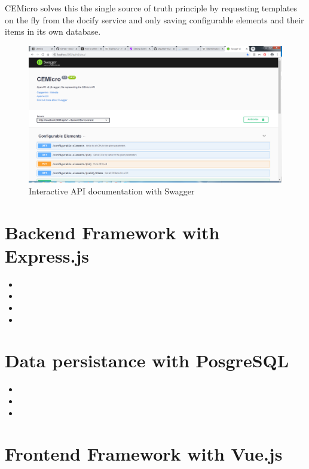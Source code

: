 CEMicro solves this the single source of truth principle by requesting templates on the fly from the docify service and only saving configurable elements and their items in its own database.

\begin{figure}
  \centering
  \includegraphics[width=0.8\linewidth]{assets/swagger-api-docs.png}
  \caption{Interactive API documentation with Swagger}
  \label{fig:api-docs}
\end{figure}


\section{Backend Framework with Express.js}

\begin{itemize}
  \item {}
  \item {}
  \item {}
  \item {}
\end{itemize}


\section{Data persistance with PosgreSQL}

\begin{itemize}
  \item {}
  \item {}
  \item {}
\end{itemize}


\section{Frontend Framework with Vue.js}

